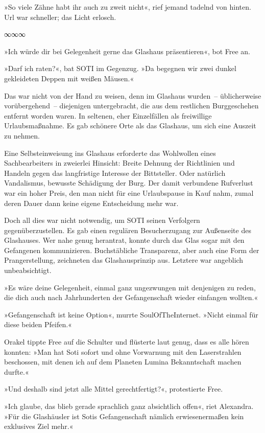 »So viele Zähne habt ihr auch zu zweit nicht«, rief jemand tadelnd von hinten. Url war schneller; das Licht erlosch.

\begin{center}
∞∞∞
\end{center}

»Ich würde dir bei Gelegenheit gerne das Glashaus präsentieren«, bot Free an.

»Darf ich raten?«, bat SOTI im Gegenzug. »Da begegnen wir zwei dunkel gekleideten Deppen mit weißen Mäusen.«

Das war nicht von der Hand zu weisen, denn im Glashaus wurden~– üblicherweise vorübergehend~– diejenigen untergebracht, die aus dem restlichen Burggeschehen entfernt worden waren. In seltenen, eher Einzelfällen als freiwillige Urlaubsmaßnahme. Es gab schönere Orte als das Glashaus, um sich eine Auszeit zu nehmen.

Eine Selbsteinweisung ins Glashaus erforderte das Wohlwollen eines Sachbearbeiters in zweierlei Hinsicht: Breite Dehnung der Richtlinien und Handeln gegen das langfristige Interesse der Bittsteller. Oder natürlich Vandalismus, bewusste Schädigung der Burg. Der damit verbundene Rufverlust war ein hoher Preis, den man nicht für eine Urlaubspause in Kauf nahm, zumal deren Dauer dann keine eigene Entscheidung mehr war.

Doch all dies war nicht notwendig, um SOTI seinen Verfolgern gegenüberzustellen. Es gab einen regulären Besucherzugang zur Außenseite des Glashauses. Wer nahe genug herantrat, konnte durch das Glas sogar mit den Gefangenen kommunizieren. Buchstäbliche Transparenz, aber auch eine Form der Prangerstellung, zeichneten das Glashausprinzip aus. Letztere war angeblich unbeabsichtigt.

»Es wäre deine Gelegenheit, einmal ganz ungezwungen mit denjenigen zu reden, die dich auch nach Jahrhunderten der Gefangenschaft wieder einfangen wollten.«

»Gefangenschaft ist keine Option«, murrte SoulOfTheInternet. »Nicht einmal für diese beiden Pfeifen.«

Orakel tippte Free auf die Schulter und flüsterte laut genug, dass es alle hören konnten: »Man hat Soti sofort und ohne Vorwarnung mit den Laserstrahlen beschossen, mit denen ich auf dem Planeten Lumina Bekanntschaft machen durfte.«

»Und deshalb sind jetzt alle Mittel gerechtfertigt?«, protestierte Free.

»Ich glaube, das blieb gerade sprachlich ganz absichtlich offen«, riet Alexandra. »Für die Glashäusler ist Sotis Gefangenschaft nämlich erwiesenermaßen kein exklusives Ziel mehr.«


